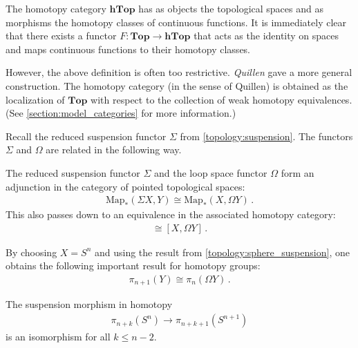     \begin{property}
        The homotopy category $\mathbf{hTop}$ has as objects the topological spaces and as morphisms the homotopy classes of continuous functions. It is immediately clear that there exists a functor $F:\mathbf{Top}\rightarrow\mathbf{hTop}$ that acts as the identity on spaces and maps continuous functions to their homotopy classes.

        However, the above definition is often too restrictive. \textit{Quillen} gave a more general construction. The homotopy category (in the sense of Quillen) is obtained as the localization of $\mathbf{Top}$ with respect to the collection of weak homotopy equivalences. (See \cref{section:model_categories} for more information.)
    \end{property}

    Recall the reduced suspension functor $\Sigma$ from \cref{topology:suspension}. The functors $\Sigma$ and $\Omega$ are related in the following way.
    \begin{property}\label{topology:eckmann_hilton}
        The reduced suspension functor $\Sigma$ and the loop space functor $\Omega$ form an adjunction in the category of pointed topological spaces:
        \begin{gather}
            \mathrm{Map}_*(\Sigma X,Y)\cong\mathrm{Map}_*(X,\Omega Y)\,.
        \end{gather}
        This also passes down to an equivalence in the associated homotopy category:
        \begin{gather}
            [\Sigma X,Y]\cong[X,\Omega Y]\,.
        \end{gather}
    \end{property}
    \begin{result}
        By choosing $X=S^n$ and using the result from \cref{topology:sphere_suspension}, one obtains the following important result for homotopy groups:
        \begin{gather}
            \pi_{n+1}(Y)\cong\pi_n(\Omega Y)\,.
        \end{gather}
    \end{result}

    \begin{theorem}\label{topology:freudenthal}
        The suspension morphism in homotopy
        \begin{gather}
            \pi_{n+k}(S^n)\rightarrow\pi_{n+k+1}(S^{n+1})
        \end{gather}
        is an isomorphism for all $k\leq n-2$.
    \end{theorem}

